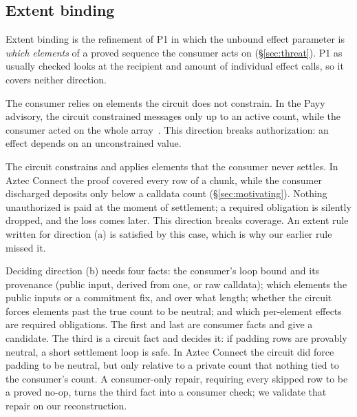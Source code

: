 \subsection{Extent binding}\label{sec:extent}

Extent binding is the refinement of P1 in which the unbound effect parameter
is \emph{which elements} of a proved sequence the consumer acts on
(\S\ref{sec:threat}). P1 as usually checked looks at the recipient and amount
of individual effect calls, so it covers neither direction.

The consumer relies on elements the circuit does not constrain. In the Payy
 advisory, the circuit constrained messages only up to an
active count, while the consumer acted on the whole array~\cite{payy-ghsa}.
This direction breaks authorization: an effect depends on an unconstrained
value.

The circuit constrains and applies elements that the consumer never settles.
In Aztec Connect the proof covered every row of a chunk, while the consumer
discharged deposits only below a calldata count
(\S\ref{sec:motivating}). Nothing unauthorized is paid at the moment of
settlement; a required obligation is silently dropped, and the loss comes
later. This direction breaks coverage. An extent rule written for direction
(a) is satisfied by this case, which is why our earlier rule missed it.%

Deciding direction (b) needs four facts: the consumer's loop bound and its
provenance (public input, derived from one, or raw calldata); which elements
the public inputs or a commitment fix, and over what length; whether the
circuit forces elements past the true count to be neutral; and which
per-element effects are required obligations. The first and last are consumer
facts and give a candidate. The third is a circuit fact and decides it: if
padding rows are provably neutral, a short settlement loop is safe. In Aztec
Connect the circuit did force padding to be neutral, but only relative to a
private count that nothing tied to the consumer's count. A consumer-only
repair, requiring every skipped row to be a proved no-op, turns the third fact
into a consumer check; we validate that repair on our reconstruction.%

